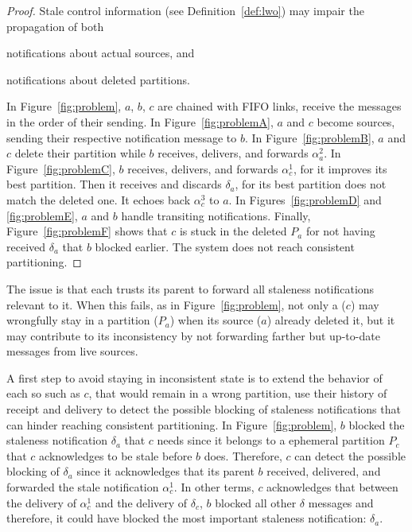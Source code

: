 \begin{proof}
Stale control information (see Definition~\ref{def:lwo}) may impair
the propagation of both
\begin{inparaenum}[(i)]
\item notifications about actual sources, and
\item notifications about deleted partitions.
\end{inparaenum}
In Figure~\ref{fig:problem}, $a$, $b$, $c$ are chained with FIFO links, \ie \processes
receive the messages in the order of their sending. %
In Figure~\ref{fig:problemA}, $a$ and $c$ become sources, sending
their respective notification message to $b$. In
Figure~\ref{fig:problemB}, $a$ and $c$ delete their partition while
$b$ receives, delivers, and forwards $\alpha_a^2$. In
Figure~\ref{fig:problemC}, $b$ receives, delivers, and forwards
$\alpha_c^1$, for it improves its best partition. Then it receives and
discards $\delta_a$, for its best partition does not match the deleted
one. It echoes back $\alpha_c^3$ to $a$. In Figures~\ref{fig:problemD}
and \ref{fig:problemE}, $a$ and $b$ handle transiting
notifications. Finally, Figure~\ref{fig:problemF} shows that $c$ is stuck
in the deleted $P_a$ for not having received $\delta_a$ that
$b$ blocked earlier. The system does not reach consistent
partitioning. \end{proof}



The issue is that each \process trusts its parent to forward all
staleness notifications relevant to it. When this fails, as in
Figure~\ref{fig:problem}, not only a \process ($c$) may wrongfully
stay in a partition ($P_a$) when its source ($a$) already deleted it,
but it may contribute to its inconsistency by not forwarding farther
but up-to-date messages from live sources.

A first step to avoid staying in inconsistent state is to extend the
behavior of each \process so \processes such as $c$, that would remain
in a wrong partition, use their history of receipt and delivery to
detect the possible blocking of staleness notifications that can
hinder reaching consistent partitioning.  In Figure~\ref{fig:problem},
$b$ blocked the staleness notification $\delta_a$ that $c$ needs since
it belongs to a ephemeral partition $P_c$ that $c$ acknowledges to be
stale before $b$ does. Therefore, $c$ can detect the possible blocking
of $\delta_a$ since it acknowledges that its parent $b$ received,
delivered, and forwarded the stale notification $\alpha_c^1$. In other
terms, \Node $c$ acknowledges that between the delivery of
$\alpha_c^1$ and the delivery of $\delta_c$, \Process $b$ blocked all other
$\delta$ messages and therefore, it could have blocked the most
important staleness notification: $\delta_a$.

